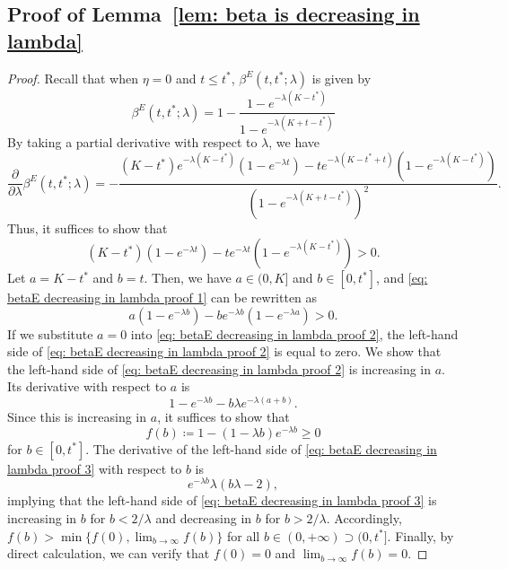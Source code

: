 \documentclass[12pt, letterpaper]{article}
\begin{document}
\subsection{Proof of Lemma~\ref{lem: beta is decreasing in lambda}}
\begin{proof} %
    Recall that when $\eta = 0$ and $t \le t^*$, $\beta^E(t, t^*; \lambda)$ is given by
    \begin{equation}
        \beta^E(t, t^*; \lambda) = 1 - \frac{1 - e^{-\lambda(K - t^*)}}{1 - e^{-\lambda(K + t - t^*)}}
    \end{equation}
    By taking a partial derivative with respect to $\lambda$, we have
    \begin{equation}
        \frac{\partial}{\partial \lambda}\beta^E(t, t^*; \lambda) = - \frac{(K - t^*)e^{- \lambda (K - t^*)} (1 - e^{- \lambda t}) - t e^{-\lambda (K - t^* + t)}(1 - e^{- \lambda (K - t^*)})}{(1 - e^{-\lambda(K + t - t^*)})^2}.
    \end{equation}
    Thus, it suffices to show that
    \begin{equation}\label{eq: betaE decreasing in lambda proof 1}
        (K - t^*) (1 - e^{- \lambda t}) - t e^{-\lambda t}(1 - e^{- \lambda (K - t^*)}) > 0.
    \end{equation}
    Let $a = K - t^*$ and $b = t$. Then, we have $a \in (0, K]$ and $b \in [0, t^*]$, and \eqref{eq: betaE decreasing in lambda proof 1} can be rewritten as
    \begin{equation}\label{eq: betaE decreasing in lambda proof 2}
        a  (1 - e^{- \lambda b}) - b e^{-\lambda b}(1 - e^{- \lambda a}) >  0.
    \end{equation}
    If we substitute $a = 0$ into \eqref{eq: betaE decreasing in lambda proof 2}, the left-hand side of \eqref{eq: betaE decreasing in lambda proof 2} is equal to zero. We show that the left-hand side of \eqref{eq: betaE decreasing in lambda proof 2} is increasing in $a$. Its derivative with respect to $a$ is 
    \begin{equation}
        1 - e^{- \lambda b} - b\lambda e^{- \lambda (a + b)}.
    \end{equation}
    Since this is increasing in $a$, it suffices to show that
    \begin{equation}\label{eq: betaE decreasing in lambda proof 3}
        f(b) \coloneqq 1 - (1 - \lambda b) e^{- \lambda b} \geq 0
    \end{equation}
    for $b \in [0, t^*]$.
    The derivative of the left-hand side of \eqref{eq: betaE decreasing in lambda proof 3} with respect to $b$ is
    \begin{equation}
        e^{- \lambda b}\lambda (b \lambda - 2),
    \end{equation}
    implying that the left-hand side of \eqref{eq: betaE decreasing in lambda proof 3} is increasing in $b$ for $b < 2/\lambda$ and decreasing in $b$ for $b > 2/\lambda$. Accordingly, $f(b) > \min\{f(0), \lim_{b \to \infty}f(b)\}$ for all $b \in (0, +\infty) \supset (0, t^*]$. Finally, by direct calculation, we can verify that $f(0) = 0$ and $\lim_{b \to \infty}f(b) = 0$.
\end{proof} %
\end{document}
